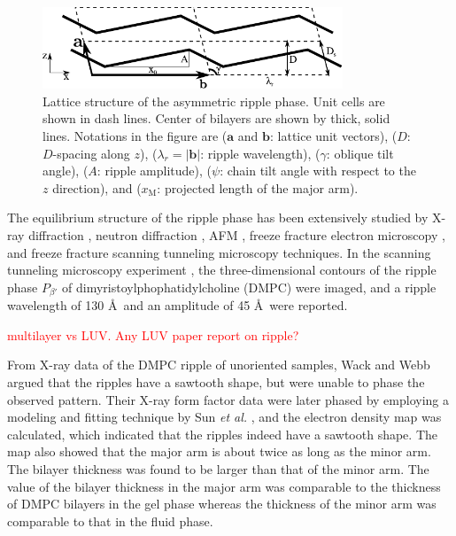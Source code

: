 \begin{figure}[htbp]
  \centering
  \includegraphics[width=0.8\textwidth]{figures/ripple/unit_cell}
  \caption{Lattice structure of the asymmetric ripple phase. Unit cells are shown in
  dash lines. Center of bilayers are shown by thick, solid lines. Notations 
  in the figure are ($\mathbf{a}$ and $\mathbf{b}$: lattice unit vectors),
  ($D$: $D$-spacing along $z$), ($\lambda_r=|\mathbf{b}|$: ripple wavelength), 
  ($\gamma$: oblique tilt angle), ($A$: ripple amplitude),
  ($\psi$: chain tilt angle with respect to the $z$ direction),
  and ($x_\textrm{M}$: projected length of the major arm).}
  \label{fig:unit_cell}
\end{figure}

The equilibrium structure of the ripple phase has been extensively studied by
X-ray diffraction \cite{ref:Janiak76,ref:Janiak79,ref:Tardieu73,ref:Wack89,ref:Yao91,ref:Sun96,ref:Cunningham98},
neutron diffraction \cite{ref:Mortensen88,ref:Bradshaw89}, 
AFM \cite{}, freeze fracture electron microscopy \cite{ref:Woodward96},
and freeze fracture scanning tunneling microscopy \cite{} techniques.
In the scanning tunneling microscopy experiment \cite{ref:Zasadzinski88}, 
the three-dimensional contours of the ripple phase $P_{\beta'}$ of
dimyristoylphophatidylcholine (DMPC) were imaged, and
a ripple wavelength of 130 \AA\ and an amplitude of 45 \AA\ were reported.

\textcolor{red}{multilayer vs LUV. Any LUV paper report on ripple?}

From X-ray data of the DMPC ripple of unoriented samples, 
Wack and Webb \cite{ref:Wack89} argued that the ripples have a sawtooth shape,
but were unable to phase the observed pattern.
Their X-ray form factor data were later
phased by employing a modeling and fitting technique by Sun \textit{et al.}
\cite{ref:Sun96}, and the electron density map was calculated, which indicated that  
the ripples indeed have a sawtooth shape. The map also showed that
the major arm is about twice as long as the minor arm. The bilayer
thickness was found to be larger than that of the minor arm. The
value of the bilayer thickness in the major arm was comparable to the
thickness of DMPC bilayers in the gel phase whereas the thickness
of the minor arm was comparable to that in the fluid phase.

